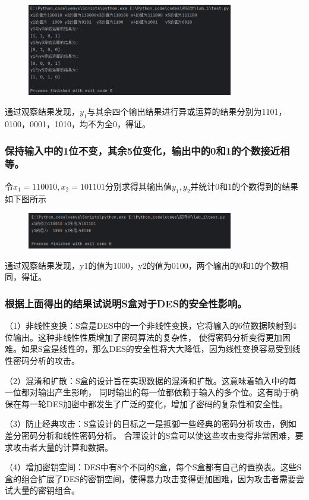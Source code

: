 \documentclass[a4paper,11pt,UTF8]{ctexart}
\newcommand{\bottomcaption}{%
\setlength{\abovecaptionskip}{6pt}%
\setlength{\belowcaptionskip}{6pt}%
\caption}
\newcommand{\xiaowuhao}{\fontsize{9pt}{\baselineskip}\selectfont}   %
\begin{document}
            \begin{figure}[H]
                \centering
                \includegraphics[width=9cm]{test_result_4.png}
                \bottomcaption{\xiaowuhao{$x\oplus 11yz00$后的输出变化的运行结果}}
            \end{figure}
            通过观察结果发现，$y_{1}$与其余四个输出结果进行异或运算的结果分别为1101，0100，0001，1010，均不为全0，得证。

        \subsubsection{保持输入中的1位不变，其余5位变化，输出中的0和1的个数接近相等。}
            令$x_{1}=110010,x_{2}=101101$分别求得其输出值$y_{1},y_{2}$并统计0和1的个数得到的结果如下图所示
            \begin{figure}[H]
                \centering
                \includegraphics[width=9cm]{test_result_5.png}
                \bottomcaption{\xiaowuhao{改变输入中的5位后的输出变化的运行结果}}
            \end{figure}
            通过观察结果发现，y1的值为1000，y2的值为0100，两个输出的0和1的个数相同，得证。
        \subsubsection{根据上面得出的结果试说明S盒对于DES的安全性影响。}
            （1）非线性变换：S盒是DES中的一个非线性变换，它将输入的6位数据映射到4位输出。这种非线性性质增加了密码算法的复杂性，
            使得密码分析变得更加困难。如果S盒是线性的，那么DES的安全性将大大降低，因为线性变换容易受到线性密码分析的攻击。\par
            （2）混淆和扩散：S盒的设计旨在实现数据的混淆和扩散。这意味着输入中的每一位都对输出产生影响，
            同时输出的每一位都依赖于输入的多个位。这有助于确保在每一轮DES加密中都发生了广泛的变化，增加了密码的复杂性和安全性。\par
            （3）防止经典攻击：S盒设计的目标之一是抵御一些经典的密码分析攻击，例如差分密码分析和线性密码分析。
            合理设计的S盒可以使这些攻击变得非常困难，要求攻击者大量的计算和数据。\par
            （4）增加密钥空间：DES中有8个不同的S盒，每个S盒都有自己的置换表。这些S盒的组合扩展了DES的密钥空间，使得暴力攻击变得更加困难，因为攻击者需要尝试大量的密钥组合。\par
\end{document}
